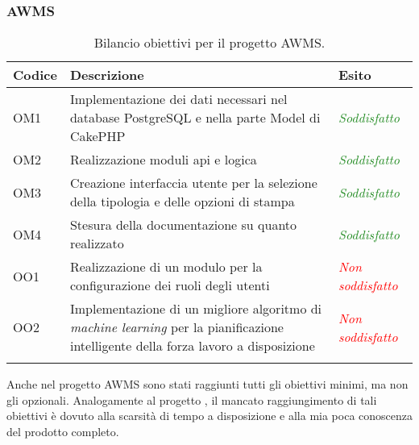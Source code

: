 \subsubsection*{AWMS}
\begin{center}
	\renewcommand{\arraystretch}{1.5}
	\begin{longtable}{ | p{0.1\linewidth} | p{0.7\linewidth} | p{0.2\linewidth}| }	 
		\hline   
	    \rowcolor{header}\textbf{Codice}&\textbf{Descrizione} & \textbf{Esito}\\
		\hline   	
    	OM1 & Implementazione dei dati necessari nel database PostgreSQL e nella parte Model di CakePHP & \textcolor{ForestGreen}{\textit{Soddisfatto}}\\
    	OM2 & Realizzazione moduli \acrshort{api} e logica & \textcolor{ForestGreen}{\textit{Soddisfatto}}\\
    	OM3 & Creazione interfaccia utente per la selezione della tipologia e delle opzioni di stampa & \textcolor{ForestGreen}{\textit{Soddisfatto}}\\
    	OM4 & Stesura della documentazione su quanto realizzato & \textcolor{ForestGreen}{\textit{Soddisfatto}}\\
    	OO1 & Realizzazione di un modulo per la configurazione dei ruoli degli utenti & \textcolor{red}{\textit{Non soddisfatto}}\\
    	OO2 & Implementazione di un migliore algoritmo di \textit{\gls{machine learning}} per la pianificazione intelligente della forza lavoro a disposizione & \textcolor{red}{\textit{Non soddisfatto}} \\
    	\hline
    	\rowcolor{white}
    	\caption{Bilancio obiettivi per il progetto AWMS.}
	\end{longtable}
	\label{tab:bilancio-obiettivi-AWMS}
\end{center}
Anche nel progetto AWMS sono stati raggiunti tutti gli obiettivi minimi, ma non gli opzionali. Analogamente al progetto \DS{}, il mancato raggiungimento di tali obiettivi è dovuto alla scarsità di tempo a disposizione e alla mia poca conoscenza del prodotto completo. 
